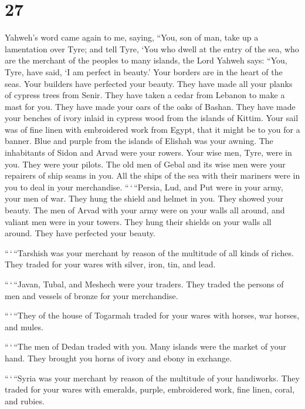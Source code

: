 \hypertarget{section-26}{%
\section{27}\label{section-26}}

 Yahweh's word came again to me, saying, 
``You, son of man, take up a lamentation over Tyre;  and
tell Tyre, `You who dwell at the entry of the sea, who are the merchant
of the peoples to many islands, the Lord Yahweh says: ``You, Tyre, have
said, `I am perfect in beauty.'  Your borders are in the
heart of the seas. Your builders have perfected your beauty.
 They have made all your planks of cypress trees from
Senir. They have taken a cedar from Lebanon to make a mast for you.
 They have made your oars of the oaks of Bashan. They have
made your benches of ivory inlaid in cypress wood from the islands of
Kittim.  Your sail was of fine linen with embroidered work
from Egypt, that it might be to you for a banner. Blue and purple from
the islands of Elishah was your awning.  The inhabitants
of Sidon and Arvad were your rowers. Your wise men, Tyre, were in you.
They were your pilots.  The old men of Gebal and its wise
men were your repairers of ship seams in you. All the ships of the sea
with their mariners were in you to deal in your merchandise.
 ``\,`\,``Persia, Lud, and Put were in your army, your
men of war. They hung the shield and helmet in you. They showed your
beauty.  The men of Arvad with your army were on your
walls all around, and valiant men were in your towers. They hung their
shields on your walls all around. They have perfected your beauty.

 ``\,`\,``Tarshish was your merchant by reason of the
multitude of all kinds of riches. They traded for your wares with
silver, iron, tin, and lead.

 ``\,`\,``Javan, Tubal, and Meshech were your traders.
They traded the persons of men and vessels of bronze for your
merchandise.

 ``\,`\,``They of the house of Togarmah traded for your
wares with horses, war horses, and mules.

 ``\,`\,``The men of Dedan traded with you. Many islands
were the market of your hand. They brought you horns of ivory and ebony
in exchange.

 ``\,`\,``Syria was your merchant by reason of the
multitude of your handiworks. They traded for your wares with emeralds,
purple, embroidered work, fine linen, coral, and rubies.

